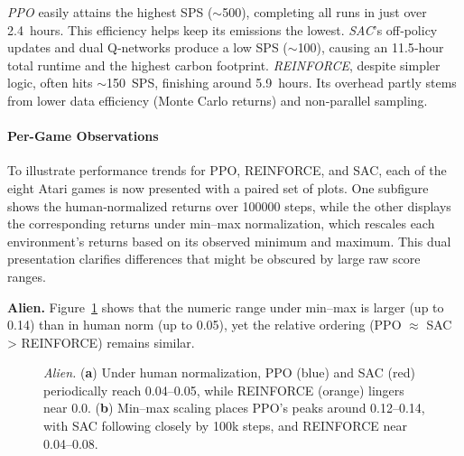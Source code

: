 \emph{PPO} easily attains the highest SPS ($\sim$\num{500}), completing all runs in just over 2.4~hours. This efficiency helps keep its emissions the lowest.  
\emph{SAC}'s off‐policy updates and dual Q‐networks produce a low SPS ($\sim$\num{100}), causing an 11.5‐hour total runtime and the highest carbon footprint.  
\emph{REINFORCE}, despite simpler logic, often hits $\sim$\num{150}~SPS, finishing around 5.9~hours. Its overhead partly stems from lower data efficiency (Monte Carlo returns) and non‐parallel sampling.

\paragraph{Per-Game Observations}
To illustrate performance trends for PPO, REINFORCE, and SAC, each of the eight Atari games is now presented with a paired set of plots. One subfigure shows the human‐normalized returns over \num{100000} steps, while the other displays the corresponding returns under min--max normalization, which rescales each environment's returns based on its observed minimum and maximum. This dual presentation clarifies differences that might be obscured by large raw score ranges.

\medskip

\noindent \textbf{Alien.} Figure~\ref{fig:alien_combined} shows that the numeric range under min--max is larger (up to 0.14) than in human norm (up to 0.05), yet the relative ordering (PPO $\approx$ SAC > REINFORCE) remains similar.

\begin{figure} 
	\centering
	\quad
	\caption{\emph{Alien.} 
		(\textbf{a}) Under human normalization, PPO (blue) and SAC (red) periodically reach 0.04--0.05, while REINFORCE (orange) lingers near 0.0.
		(\textbf{b}) Min--max scaling places PPO's peaks around 0.12--0.14, with SAC following closely by 100k steps, and REINFORCE near 0.04--0.08.}
	\label{fig:alien_combined}
\end{figure}

\medskip


